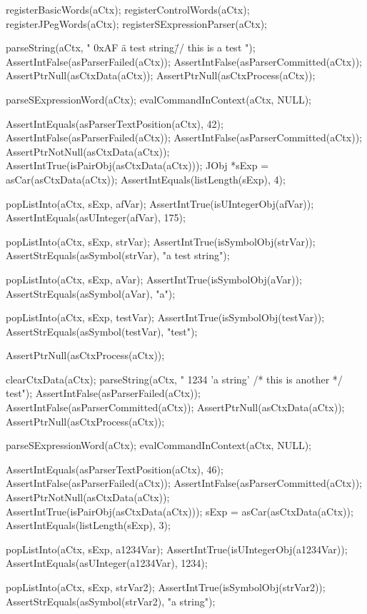   registerBasicWords(aCtx);
  registerControlWords(aCtx);
  registerJPegWords(aCtx);
  registerSExpressionParser(aCtx);
  
  parseString(aCtx, " 0xAF \"a test string\" // this is \n a test ");
  AssertIntFalse(asParserFailed(aCtx));
  AssertIntFalse(asParserCommitted(aCtx));
  AssertPtrNull(asCtxData(aCtx));
  AssertPtrNull(asCtxProcess(aCtx));
  
  parseSExpressionWord(aCtx);
  evalCommandInContext(aCtx, NULL);
  
  AssertIntEquals(asParserTextPosition(aCtx), 42);
  AssertIntFalse(asParserFailed(aCtx));
  AssertIntFalse(asParserCommitted(aCtx));
  AssertPtrNotNull(asCtxData(aCtx));
  AssertIntTrue(isPairObj(asCtxData(aCtx)));
  JObj *sExp = asCar(asCtxData(aCtx));
  AssertIntEquals(listLength(sExp), 4);

  popListInto(aCtx, sExp, afVar);
  AssertIntTrue(isUIntegerObj(afVar));
  AssertIntEquals(asUInteger(afVar), 175);
  
  popListInto(aCtx, sExp, strVar);
  AssertIntTrue(isSymbolObj(strVar));
  AssertStrEquals(asSymbol(strVar), "a test string");
  
  popListInto(aCtx, sExp, aVar);
  AssertIntTrue(isSymbolObj(aVar));
  AssertStrEquals(asSymbol(aVar), "a");
  
  popListInto(aCtx, sExp, testVar);
  AssertIntTrue(isSymbolObj(testVar));
  AssertStrEquals(asSymbol(testVar), "test");
  
  AssertPtrNull(asCtxProcess(aCtx));
  
  clearCtxData(aCtx);
  parseString(aCtx, " 1234 'a string' /* this is \n another  */ test");
  AssertIntFalse(asParserFailed(aCtx));
  AssertIntFalse(asParserCommitted(aCtx));
  AssertPtrNull(asCtxData(aCtx));
  AssertPtrNull(asCtxProcess(aCtx));
  
  parseSExpressionWord(aCtx);
  evalCommandInContext(aCtx, NULL);

  AssertIntEquals(asParserTextPosition(aCtx), 46);
  AssertIntFalse(asParserFailed(aCtx));
  AssertIntFalse(asParserCommitted(aCtx));
  AssertPtrNotNull(asCtxData(aCtx));
  AssertIntTrue(isPairObj(asCtxData(aCtx)));
  sExp = asCar(asCtxData(aCtx));
  AssertIntEquals(listLength(sExp), 3);
  
  popListInto(aCtx, sExp, a1234Var);
  AssertIntTrue(isUIntegerObj(a1234Var));
  AssertIntEquals(asUInteger(a1234Var), 1234);
  
  popListInto(aCtx, sExp, strVar2);
  AssertIntTrue(isSymbolObj(strVar2));
  AssertStrEquals(asSymbol(strVar2), "a string");
  

